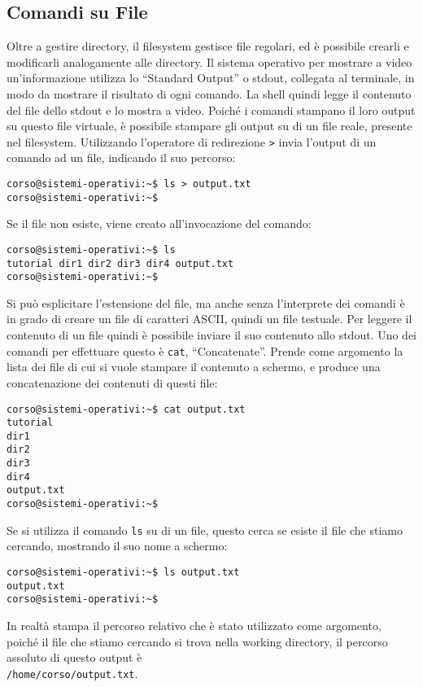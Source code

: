 \documentclass{article}
\numberwithin{equation}{subsection}
\begin{document}
\subsection{Comandi su File}

Oltre a gestire directory, il filesystem gestisce file regolari, ed è possibile crearli e modificarli analogamente alle directory. Il sistema operativo per mostrare a video un'informazione utilizza lo ``Standard Output'' o stdout, collegata al terminale, in modo da mostrare il risultato di ogni comando. La shell quindi legge il contenuto 
del file dello stdout e lo mostra a video. Poiché i comandi stampano il loro output su questo file virtuale, è possibile stampare gli output su di un file reale, presente nel filesystem. 
Utilizzando l'operatore di redirezione \verb|>| invia l'output di un comando ad un file, indicando il suo percorso:
\begin{verbatim}
corso@sistemi-operativi:~$ ls > output.txt
corso@sistemi-operativi:~$
\end{verbatim}
Se il file non esiste, viene creato all'invocazione del comando:
\begin{verbatim}
corso@sistemi-operativi:~$ ls
tutorial dir1 dir2 dir3 dir4 output.txt
corso@sistemi-operativi:~$
\end{verbatim}
Si può esplicitare l'estensione del file, ma anche senza l'interprete dei comandi è in grado di creare un file di caratteri ASCII, quindi un file testuale. Per leggere il contenuto di un file quindi è possibile 
inviare il suo contenuto allo stdout. Uno dei comandi per effettuare questo è \verb|cat|, ``Concatenate''. Prende come argomento la lista dei file di cui si vuole stampare il contenuto a schermo, e produce 
una concatenazione dei contenuti di questi file:
\begin{verbatim}
corso@sistemi-operativi:~$ cat output.txt
tutorial 
dir1 
dir2
dir3
dir4
output.txt
corso@sistemi-operativi:~$
\end{verbatim}
Se si utilizza il comando \verb|ls| su di un file, questo cerca se esiste il file che stiamo cercando, mostrando il suo nome a schermo:
\begin{verbatim}
corso@sistemi-operativi:~$ ls output.txt
output.txt
corso@sistemi-operativi:~$
\end{verbatim}
In realtà stampa il percorso relativo che è stato utilizzato come argomento, poiché il file che stiamo cercando si trova nella working directory, il percorso assoluto di questo output è\\
\verb|/home/corso/output.txt|. 
\end{document}
